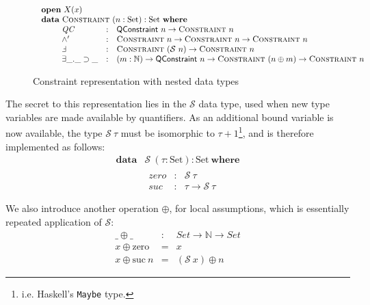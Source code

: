 \documentclass[a4paper]{jfp}
\begin{document}
\begin{figure}[H]
\begin{displaymath}
\begin{array}{l}
	\begin{array}{l}
      \textbf{open}\  X(x)\\ 
		\textbf{data}\  \textsc{Constraint}\ (n :\text{Set}) : \text{Set}\ \textbf{where} \\ \qquad
		               \begin{array}{lcl}
                   \mathit{QC} & : &   \textsf{QConstraint}\ n \rightarrow \textsc{Constraint}\ n \\
						 \land'   & : & \textsc{Constraint}\ n \rightarrow \textsc{Constraint}\ n 
                                                              \rightarrow \textsc{Constraint}\ n \\
						 \Finv    & : & \textsc{Constraint}\ (\mathcal{S}\ n) \rightarrow \textsc{Constraint}\ n \\
                   \exists\_.\_\supset\_ & : & (m : \mathbb{N}) \rightarrow \textsf{QConstraint}\ n \rightarrow \textsc{Constraint}\ (n \oplus m)
          \rightarrow \textsc{Constraint}\ n
					    \end{array} \\
     \end{array}
   \end{array}
\end{displaymath}
\caption{Constraint representation with nested data types}
\end{figure}

The secret to this representation lies in the $\mathcal{S}$ data type, used when new type variables are made available by quantifiers. As an
additional bound variable is now available, the type $\mathcal{S}\ \tau$ must be isomorphic to $\tau + 1$\footnote{i.e. Haskell's {\tt Maybe} type.},
and is therefore implemented as follows:
\begin{displaymath}   
	\begin{array}{ll}		
		\textbf{data} & \mathcal{S}\ (\tau : \text{Set}) : \text{Set}\ \textbf{where} \\
		              & \begin{array}{lcl}
                         \mathit{zero} & : & \mathcal{S}\ \tau \\
						 \mathit{suc} & : & \tau \rightarrow \mathcal{S}\ \tau \\
					    \end{array} \\						
     \end{array}
\end{displaymath}	 
We also introduce another operation $\oplus$, for local assumptions, which is essentially repeated application of $\mathcal{S}$:
\begin{displaymath}
   \begin{array}{lll}
      \_ \oplus \_ & : & Set \rightarrow \mathbb{N} \rightarrow Set \\
      x \oplus \text{zero} & = & x \\ 
      x \oplus \text{suc}\ n & = & (\mathcal{S}\ x) \oplus n
      \end{array}
\end{displaymath}
\end{document}

